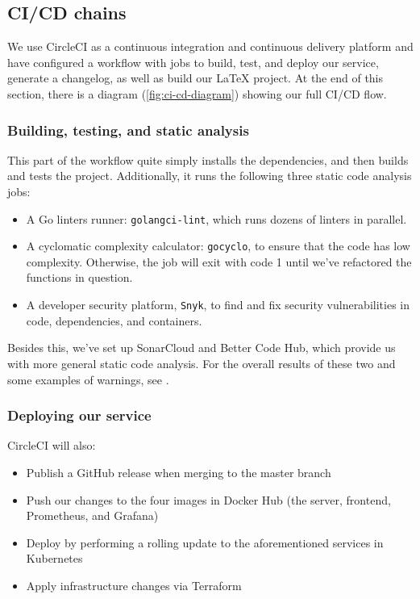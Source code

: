 \subsection{CI/CD chains}
\label{sec:ci-cd-chains}

We use CircleCI as a continuous integration and continuous delivery platform and have configured a workflow \cite{workflow:circleci} with jobs to build, test, and deploy our service, generate a changelog, as well as build our LaTeX project. At the end of this section, there is a diagram (\autoref{fig:ci-cd-diagram}) showing our full CI/CD flow.

\subsubsection{Building, testing, and static analysis}

This part of the workflow quite simply installs the dependencies, and then builds and tests the project. Additionally, it runs the following three static code analysis jobs:
\begin{itemize}
    \item A Go linters runner: \texttt{golangci-lint}, which runs dozens of linters in parallel.
    \item A cyclomatic complexity calculator: \texttt{gocyclo}, to ensure that the code has low complexity. Otherwise, the job will exit with code 1 until we've refactored the functions in question.
    \item A developer security platform, \texttt{Snyk}, to find and fix security vulnerabilities in code, dependencies, and containers.
\end{itemize}

Besides this, we've set up SonarCloud and Better Code Hub, which provide us with more general static code analysis. For the overall results of these two and some examples of warnings, see .

\subsubsection{Deploying our service}

CircleCI will also:
\begin{itemize}
    \item Publish a GitHub release when merging to the master branch
    \item Push our changes to the four images in Docker Hub (the server, frontend, Prometheus, and Grafana)
    \item Deploy by performing a rolling update to the aforementioned services in Kubernetes
    \item Apply infrastructure changes via Terraform
\end{itemize}



